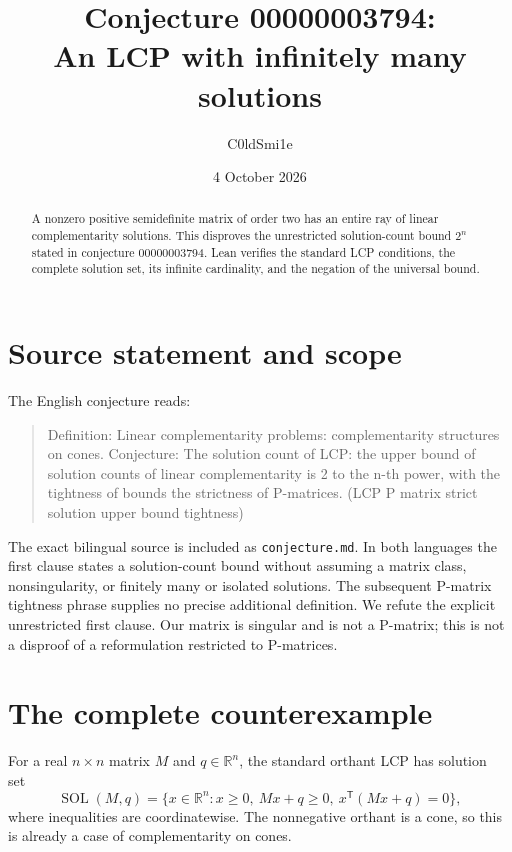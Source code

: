 \documentclass[11pt]{article}
\title{Conjecture 00000003794:\\An LCP with infinitely many solutions}
\author{C0ldSmi1e}
\date{4 October 2026}
\newcommand{\R}{\mathbb R}
\newcommand{\SOL}{\operatorname{SOL}}
\begin{document}
\maketitle
\begin{abstract}
A nonzero positive semidefinite matrix of order two has an entire ray of linear complementarity solutions. This disproves the unrestricted solution-count bound $2^n$ stated in conjecture 00000003794. Lean verifies the standard LCP conditions, the complete solution set, its infinite cardinality, and the negation of the universal bound.
\end{abstract}

\section{Source statement and scope}
The English conjecture reads:
\begin{quote}
Definition: Linear complementarity problems: complementarity structures on cones. Conjecture: The solution count of LCP: the upper bound of solution counts of linear complementarity is 2 to the n-th power, with the tightness of bounds the strictness of P-matrices. (LCP P matrix strict solution upper bound tightness)
\end{quote}
The exact bilingual source is included as \texttt{conjecture.md}. In both languages the first clause states a solution-count bound without assuming a matrix class, nonsingularity, or finitely many or isolated solutions. The subsequent P-matrix tightness phrase supplies no precise additional definition. We refute the explicit unrestricted first clause. Our matrix is singular and is not a P-matrix; this is not a disproof of a reformulation restricted to P-matrices.

\section{The complete counterexample}
For a real $n\times n$ matrix $M$ and $q\in\R^n$, the standard orthant LCP has solution set~\cite[p.~540]{chen}
\[
 \SOL(M,q)=\{x\in\R^n:x\geq0,\ Mx+q\geq0,\ x^{\mathsf T}(Mx+q)=0\},
\]
where inequalities are coordinatewise. The nonnegative orthant is a cone, so this is already a case of complementarity on cones.
\end{document}
